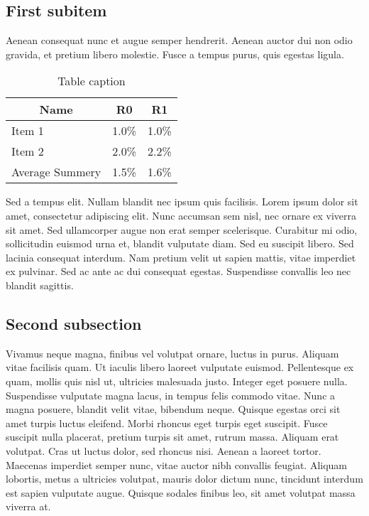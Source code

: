 \documentclass[10pt,a4paper,twoside,twocolumn]{article}
\begin{document}
\subsection{First subitem}

Aenean consequat nunc et augue semper hendrerit. Aenean auctor dui non odio gravida, et pretium libero molestie. Fusce a tempus purus, quis egestas ligula.

\begin{table}[ht]
\centering
\begin{tabular}{@{}lcc@{}}
\toprule
\multicolumn{1}{c}{\textbf{Name}} & \textbf{R0} & \textbf{R1} \\ \midrule
\multicolumn{1}{|l|}{Item 1} & \multicolumn{1}{c|}{1.0\%} & \multicolumn{1}{c|}{1.0\%} \\ \midrule
\multicolumn{1}{|l|}{Item 2} & \multicolumn{1}{c|}{2.0\%} & \multicolumn{1}{c|}{2.2\%} \\ \midrule
\multicolumn{1}{r}{Average Summery} & \multicolumn{1}{l}{1.5\%} & \multicolumn{1}{l}{1.6\%} \\ \bottomrule
\end{tabular}
\caption{Table caption}\label{tab:table-ref}
\end{table}

Sed a tempus elit. Nullam blandit nec ipsum quis facilisis. Lorem ipsum dolor sit amet, consectetur adipiscing elit. Nunc accumsan sem nisl, nec ornare ex viverra sit amet. Sed ullamcorper augue non erat semper scelerisque. Curabitur mi odio, sollicitudin euismod urna et, blandit vulputate diam. Sed eu suscipit libero. Sed lacinia consequat interdum. Nam pretium velit ut sapien mattis, vitae imperdiet ex pulvinar. Sed ac ante ac dui consequat egestas. Suspendisse convallis leo nec blandit sagittis.

\subsection{Second subsection}

Vivamus neque magna, finibus vel volutpat ornare, luctus in purus. Aliquam vitae facilisis quam. Ut iaculis libero laoreet vulputate euismod. Pellentesque ex quam, mollis quis nisl ut, ultricies malesuada justo. Integer eget posuere nulla. Suspendisse vulputate magna lacus, in tempus felis commodo vitae. Nunc a magna posuere, blandit velit vitae, bibendum neque. Quisque egestas orci sit amet turpis luctus eleifend. Morbi rhoncus eget turpis eget suscipit. Fusce suscipit nulla placerat, pretium turpis sit amet, rutrum massa. Aliquam erat volutpat. Cras ut luctus dolor, sed rhoncus nisi. Aenean a laoreet tortor. Maecenas imperdiet semper nunc, vitae auctor nibh convallis feugiat. Aliquam lobortis, metus a ultricies volutpat, mauris dolor dictum nunc, tincidunt interdum est sapien vulputate augue. Quisque sodales finibus leo, sit amet volutpat massa viverra at.
\end{document}

